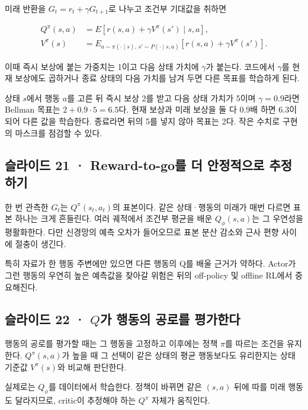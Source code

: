 \documentclass[11pt,a4paper]{article}
\begin{document}
미래 반환을 $G_t=r_t+\gamma G_{t+1}$로 나누고 조건부 기대값을 취하면\par

\[
\begin{aligned}
Q^\pi(s,a)
&=E[r(s,a)+\gamma V^\pi(s')\mid s,a],\\
V^\pi(s)
&=E_{a\sim\pi(\cdot\mid s),\,s'\sim P(\cdot\mid s,a)}
[r(s,a)+\gamma V^\pi(s')].
\end{aligned}
\]

이때 즉시 보상에 붙는 가중치는 1이고 다음 상태 가치에 $\gamma$가 붙는다. 코드에서 $\gamma$를 현재 보상에도 곱하거나 종료 상태의 다음 가치를 남겨 두면 다른 목표를 학습하게 된다.\par

상태 $s$에서 행동 $a$를 고른 뒤 즉시 보상 2를 받고 다음 상태 가치가 5이며 $\gamma=0.9$라면 Bellman 목표는 $2+0.9\cdot5=6.5$다. 현재 보상과 미래 보상을 둘 다 0.9배 하면 6.3이 되어 다른 값을 학습한다. 종료라면 뒤의 5를 넣지 않아 목표는 2다. 작은 수치로 구현의 마스크를 점검할 수 있다.\par

\subsection{슬라이드 21 · Reward-to-go를 더 안정적으로 추정하기}

한 번 관측한 $G_t$는 $Q^\pi(s_t,a_t)$의 표본이다. 같은 상태·행동의 미래가 매번 다르면 표본 하나는 크게 흔들린다. 여러 궤적에서 조건부 평균을 배운 $Q_\phi(s,a)$는 그 우연성을 평활화한다. 다만 신경망의 예측 오차가 들어오므로 표본 분산 감소와 근사 편향 사이에 절충이 생긴다.\par

특히 자료가 한 행동 주변에만 있으면 다른 행동의 Q를 배울 근거가 약하다. Actor가 그런 행동의 우연히 높은 예측값을 찾아갈 위험은 뒤의 off-policy 및 offline RL에서 중요해진다.\par

\subsection{슬라이드 22 · $Q$가 행동의 공로를 평가한다}

행동의 공로를 평가할 때는 그 행동을 고정하고 이후에는 정책 $\pi$를 따르는 조건을 유지한다. $Q^\pi(s,a)$가 높을 때 그 선택이 같은 상태의 평균 행동보다도 유리한지는 상태 기준값 $V^\pi(s)$와 비교해 판단한다.\par

실제로는 $Q_\phi$를 데이터에서 학습한다. 정책이 바뀌면 같은 $(s,a)$ 뒤에 따를 미래 행동도 달라지므로, critic이 추정해야 하는 $Q^\pi$ 자체가 움직인다.\par
\end{document}
